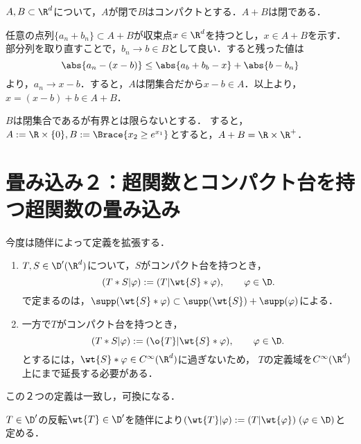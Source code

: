 \documentclass[uplatex,dvipdfmx]{jsreport}
\begin{document}
\begin{lemma}[閉集合のコンパクトな移動は閉]\label{lemma-compact-translation-of-closed-set}
    $A,B\subset\R^d$について，$A$が閉で$B$はコンパクトとする．$A+B$は閉である．
\end{lemma}
\begin{Proof}
    任意の点列$\{a_n+b_n\}\subset A+B$が収束点$x\in\R^d$を持つとし，$x\in A+B$を示す．
    部分列を取り直すことで，$b_n\to b\in B$として良い．すると残った値は
    \[\abs{a_n-(x-b)}\le\abs{a_b+b_b-x}+\abs{b-b_n}\]
    より，$a_n\to x-b$．すると，$A$は閉集合だから$x-b\in A$．以上より，$x=(x-b)+b\in A+B$．
\end{Proof}
\begin{remark}[コンパクトじゃない移動は開き得る]
    $B$は閉集合であるが有界とは限らないとする．
    すると，$A:=\R\times\{0\},B:=\Brace{x_2\ge e^{x_1}}$とすると，$A+B=\R\times\R^+$．
\end{remark}

\section{畳み込み２：超関数とコンパクト台を持つ超関数の畳み込み}

\begin{tcolorbox}[colframe=ForestGreen, colback=ForestGreen!10!white,breakable,colbacktitle=ForestGreen!40!white,coltitle=black,fonttitle=\bfseries\sffamily,
title=]
    今度は随伴によって定義を拡張する．
    \begin{enumerate}
        \item $T,S\in\D'(\R^d)$について，$S$がコンパクト台を持つとき，
        \[(T*S|\varphi):=(T|\wt{S}*\varphi),\qquad\varphi\in\D.\]
        で定まるのは，$\supp(\wt{S}*\varphi)\subset\supp(\wt{S})+\supp(\varphi)$による．
        \item 一方で$T$がコンパクト台を持つとき，
        \[(T*S|\varphi):=(\o{T}|\wt{S}*\varphi),\qquad\varphi\in\D.\]
        とするには，$\wt{S}*\varphi\in C^\infty(\R^d)$に過ぎないため，
        $T$の定義域を$C^\infty(\R^d)$上にまで延長する必要がある．
    \end{enumerate}
    この２つの定義は一致し，可換になる．
\end{tcolorbox}

\begin{notation}[超関数の反転]
    $T\in\D'$の反転$\wt{T}\in\D'$を随伴により$(\wt{T}|\varphi):=(T|\wt{\varphi})\;(\varphi\in\D)$と定める．
\end{notation}
\end{document}

